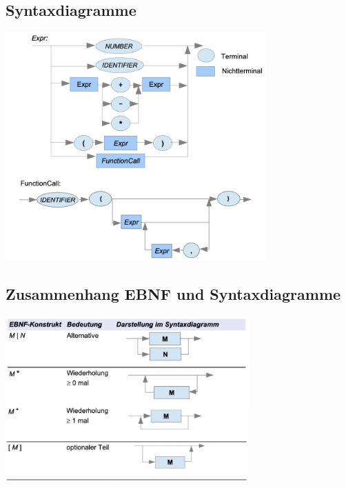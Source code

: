 \documentclass{scrreprt}
\begin{document}
\subsection{Syntaxdiagramme}
\includegraphics[width=0.75\textwidth]{"graphics/Syntaxdiagramm"}
\subsection{Zusammenhang EBNF und Syntaxdiagramme}
\includegraphics[width=0.7\textwidth]{"graphics/zusammenhang"}
\end{document}
